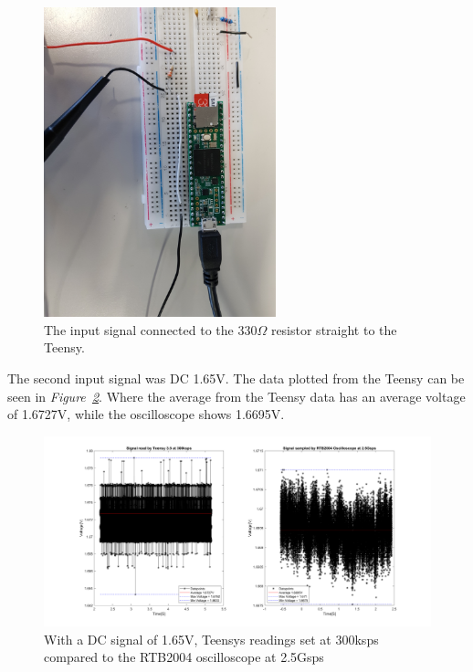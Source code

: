 \begin{figure}[h]
    \centering
    \includegraphics[width=0.6\textwidth]{graphics/Last2Tests.jpg}
    \caption{The input signal connected to the 330$\Omega$ resistor straight to the Teensy.}
    \label{fig:Last2TestsSetup}
\end{figure}

The second input signal was DC 1.65V.
The data plotted from the Teensy can be seen in \textit{Figure~\ref{fig:OscilloCompTeensyDC}}.
Where the average from the Teensy data has an average voltage of 1.6727V, while the oscilloscope shows 1.6695V.


\begin{figure}[h]
    \centering
    \includegraphics[width=1.0\textwidth]{graphics/OscilloTeensyDC165Read.png}
    \caption{With a DC signal of 1.65V, Teensys readings set at 300ksps compared to the RTB2004 oscilloscope at 2.5Gsps}
    \label{fig:OscilloCompTeensyDC}
\end{figure}

